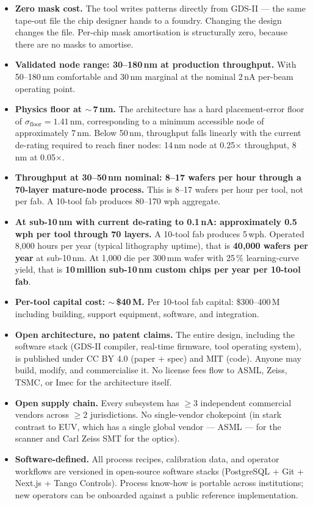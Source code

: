 \documentclass[11pt,letterpaper]{article}
\begin{document}
\begin{itemize}[leftmargin=1.6em]
  \item \textbf{Zero mask cost.} The tool writes patterns directly from GDS-II --- the same tape-out file the chip designer hands to a foundry. Changing the design changes the file. Per-chip mask amortisation is structurally zero, because there are no masks to amortise.
  \item \textbf{Validated node range: 30--180\,nm at production throughput.} With 50--180\,nm comfortable and 30\,nm marginal at the nominal 2\,nA per-beam operating point.
  \item \textbf{Physics floor at $\sim$\,7\,nm.} The architecture has a hard placement-error floor of $\sigma_\text{floor} = 1.41$\,nm, corresponding to a minimum accessible node of approximately 7\,nm. Below 50\,nm, throughput falls linearly with the current de-rating required to reach finer nodes: 14\,nm node at 0.25$\times$ throughput, 8\,nm at 0.05$\times$.
  \item \textbf{Throughput at 30--50\,nm nominal: 8--17 wafers per hour through a 70-layer mature-node process.} This is 8--17 wafers per hour per tool, not per fab. A 10-tool fab produces 80--170 wph aggregate.
  \item \textbf{At sub-10\,nm with current de-rating to 0.1\,nA: approximately 0.5\,wph per tool through 70 layers.} A 10-tool fab produces 5\,wph. Operated 8{,}000 hours per year (typical lithography uptime), that is \textbf{40{,}000 wafers per year} at sub-10\,nm. At 1{,}000 die per 300\,mm wafer with 25\,\% learning-curve yield, that is \textbf{10\,million sub-10\,nm custom chips per year per 10-tool fab}.
  \item \textbf{Per-tool capital cost: $\sim$\,\$40\,M.} Per 10-tool fab capital: \$300--400\,M including building, support equipment, software, and integration.
  \item \textbf{Open architecture, no patent claims.} The entire design, including the software stack (GDS-II compiler, real-time firmware, tool operating system), is published under CC BY 4.0 (paper + spec) and MIT (code). Anyone may build, modify, and commercialise it. No license fees flow to ASML, Zeiss, TSMC, or Imec for the architecture itself.
  \item \textbf{Open supply chain.} Every subsystem has $\geq 3$ independent commercial vendors across $\geq 2$ jurisdictions. No single-vendor chokepoint (in stark contrast to EUV, which has a single global vendor --- ASML --- for the scanner and Carl Zeiss SMT for the optics).
  \item \textbf{Software-defined.} All process recipes, calibration data, and operator workflows are versioned in open-source software stacks (PostgreSQL + Git + Next.js + Tango Controls). Process know-how is portable across institutions; new operators can be onboarded against a public reference implementation.
\end{itemize}
\end{document}
